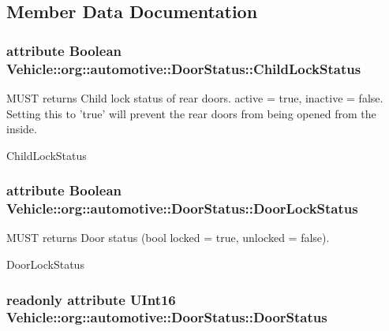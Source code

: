 \subsection{Member Data Documentation}
\hypertarget{interfaceVehicle_1_1org_1_1automotive_1_1DoorStatus_a682f1828dfa219ae0ba18d54029ea6ff}{
\subsubsection[{Child\-Lock\-Status}]{\setlength{\rightskip}{0pt plus 5cm}attribute Boolean Vehicle\-::org\-::automotive\-::\-Door\-Status\-::\-Child\-Lock\-Status}}\label{interfaceVehicle_1_1org_1_1automotive_1_1DoorStatus_a682f1828dfa219ae0ba18d54029ea6ff}


M\-U\-S\-T returns Child lock status of rear doors. active = true, inactive = false. Setting this to 'true' will prevent the rear doors from being opened from the inside. 

Child\-Lock\-Status \hypertarget{interfaceVehicle_1_1org_1_1automotive_1_1DoorStatus_a92f3230d4fc471eab8541be36324e902}{
\subsubsection[{Door\-Lock\-Status}]{\setlength{\rightskip}{0pt plus 5cm}attribute Boolean Vehicle\-::org\-::automotive\-::\-Door\-Status\-::\-Door\-Lock\-Status}}\label{interfaceVehicle_1_1org_1_1automotive_1_1DoorStatus_a92f3230d4fc471eab8541be36324e902}


M\-U\-S\-T returns Door status (bool locked = true, unlocked = false). 

Door\-Lock\-Status \hypertarget{interfaceVehicle_1_1org_1_1automotive_1_1DoorStatus_a9df11347f9dc6b16d7be1ba632fc466d}{
\subsubsection[{Door\-Status}]{\setlength{\rightskip}{0pt plus 5cm}readonly attribute U\-Int16 Vehicle\-::org\-::automotive\-::\-Door\-Status\-::\-Door\-Status}}\label{interfaceVehicle_1_1org_1_1automotive_1_1DoorStatus_a9df11347f9dc6b16d7be1ba632fc466d}


